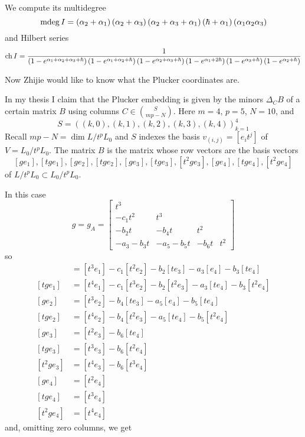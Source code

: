 \documentclass[11pt,draft]{article}
\begin{document}
We compute its multidegree
\[
\operatorname{mdeg} I = \left({\alpha}_{2}+{\alpha}_{1}\right)\left({\alpha}_{2}+{\alpha}_{3}\right)\left({\alpha}_{2}+{\alpha}_{3}+{\alpha}_{1}\right)\left(\hbar+{\alpha}_{1}\right)\left({\alpha}_{1}{\alpha}_{2}{\alpha}_{3}\right)    
\]
and Hilbert series 
{\scriptsize
\[
    \operatorname{ch} I=\frac{1}{\left(1-e^{\alpha_1 + \alpha_2 + \alpha_3 + \hbar}\right)\left(1-e^{\alpha_1 + \alpha_2 + \hbar}\right)\left(1-e^{\alpha_2 + \alpha_3 + \hbar}\right)\left(1-e^{\alpha_1 + 2\hbar}\right)\left(1-e^{\alpha_3 + \hbar}\right)\left(1-e^{\alpha_2 + \hbar}\right)} 
\]}

Now Zhijie would like to know what the Plucker coordinates are. 

In my thesis I claim that the Plucker embedding is given by the minors $\Delta_C B$ of a certain matrix $B$ using columns $C\in\binom{S}{mp-N}$. Here
$m = 4$, $p = 5$, $N = 10$, and 
$$
S = ((k,0),(k,1),(k,2),(k,3),(k,4))_{k=1}^4
$$
Recall $mp-N = \dim L/t^pL_0$ and $S$ indexes the basis $v_{(i,j)} = [e_it^j]$ of $V = L_0/t^pL_0$. The matrix $B$ is the matrix whose row vectors are the basis vectors  
\[
[ge_1],[tge_1],[ge_2],[tge_2],[ge_3],[tge_3],[t^2ge_3],[ge_4],[tge_4],[t^2ge_4]
\] 
of $L/t^pL_0\subset L_0/t^pL_0$.

In this case 
\[
g = g_A = \begin{bmatrix}
    t^3 \\
    -c_1t^2 & t^3 \\
    -b_2t & -b_4 t & t^2 \\
    -a_3 - b_3 t & - a_5 - b_5 t & -b_6 t & t^2 
\end{bmatrix}    
\]
so 
\begin{align*}
    [ge_1] &= [t^3 e_1] -c_1[t^2 e_2] -b_2[te_3] - a_3[e_4] - b_3[te_4] \\
    [tge_1] &= {[t^4 e_1]} -c_1[t^3 e_2] -b_2 [t^2 e_3] - a_3 [te_4] - b_3 [t^2 e_4] \\
    [ge_2] &= [t^3 e_2] - b_4 [te_3] -a_5[e_4] - b_5[t e_4] \\
    [tge_2] &= {[t^4 e_2]} - b_4 [t^2e_3] - a_5 [te_4] - b_5 [t^2 e_4] \\
    [ge_3] &= [t^2 e_3] -b_6 [te_4] \\
    [tge_3] &= {[t^3e_3]} - b_6 [t^2 e_4] \\
    [t^2 ge_3] &= [t^4e_3] - b_6 [t^3 e_4]\\
    [ge_4] &= [t^2 e_4] \\
    [tge_4] &= [t^3 e_4] \\
    [t^2 ge_4] &= [t^4 e_4]
\end{align*}
and, omitting zero columns, we get 
\hfill
\end{document}
